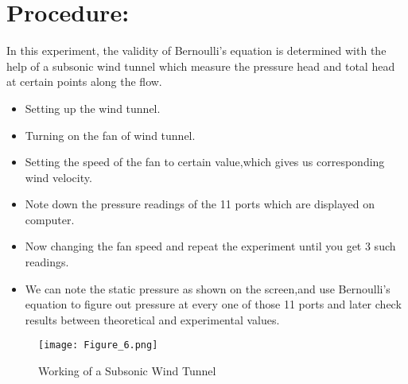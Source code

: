 \documentclass[12pt,a4paper]{article}
\begin{document}
\section{Procedure:}
In this experiment, the validity of Bernoulli’s equation is determined with the help of a subsonic wind tunnel which measure the pressure head and total head at certain points along the flow.
\begin{itemize}
\item Setting up the wind tunnel.
\item Turning on the fan of wind tunnel.
\item Setting the speed of the fan to certain value,which gives us corresponding wind velocity.
\item Note down the pressure readings of the 11 ports which are displayed on computer.
\item Now changing the fan speed and repeat the experiment until you get 3 such readings.
\item We can note the static pressure as shown on the screen,and use Bernoulli’s equation to figure out pressure at every one of those 11 ports and later check results between theoretical and experimental values.
\end{itemize}
\begin{figure}[!ht]
	\begin{center}
			\texttt{[image: Figure\_6.png]}
	\end{center}
	\caption{Working of a Subsonic Wind Tunnel}
\end{figure}
\end{document}
